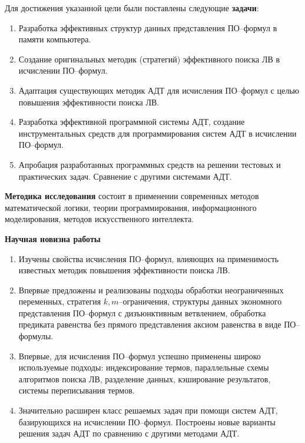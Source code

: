 \documentclass[a4paper]{report}
\begin{document}
Для достижения указанной цели были поставлены следующие \textbf{задачи}:
\begin{enumerate}
\item Разработка эффективных структур данных представления ПО--формул в памяти компьютера.
\item Создание оригинальных методик (стратегий) эффективного поиска ЛВ в исчислении ПО--формул.
\item Адаптация существующих методик АДТ для исчисления ПО--формул с целью повышения эффективности поиска ЛВ.
\item Разработка эффективной программной системы АДТ, создание инструментальных средств для программирования систем АДТ в исчислении ПО--формул.
\item Апробация разработанных программных средств на решении тестовых и практических задач. Сравнение с другими системами АДТ.
\end{enumerate}

\textbf{Методика исследования} состоит в применении современных методов математической логики, теории программирования, информационного моделирования, методов искусственного интеллекта.


\textbf{Научная новизна работы}
\begin{enumerate}
\item Изучены свойства исчисления ПО--формул, влияющих на применимость известных методик повышения эффективности поиска ЛВ.
\item Впервые предложены и реализованы подходы обработки неограниченных переменных, стратегия $k,m$--ограничения, структуры данных экономного представления ПО--формул с дизъюнктивным ветвлением, обработка предиката равенства без прямого представления аксиом равенства в виде ПО--формулы.
\item Впервые, для исчисления ПО--формул успешно применены широко используемые подходы: индексирование термов, параллельные схемы алгоритмов поиска ЛВ, разделение данных, кэширование результатов, системы переписывания термов.
\item Значительно расширен класс решаемых задач при помощи систем АДТ, базирующихся на исчислении ПО--формул. Построены новые варианты решения задач АДТ по сравнению с другими методами АДТ.
\end{enumerate}
\end{document}
